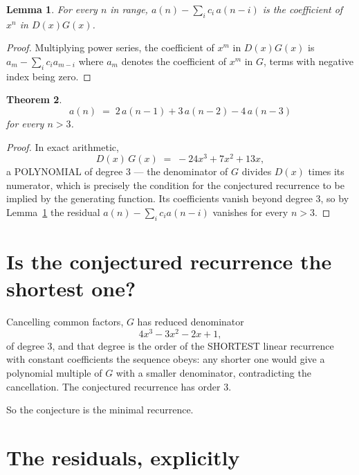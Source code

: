 \documentclass[11pt,a4paper]{article}
\theoremstyle{plain}
\newtheorem{theorem}{Theorem}
\newtheorem{lemma}[theorem]{Lemma}
\theoremstyle{definition}
\begin{document}
\begin{lemma}\label{lem:key}
For every $n$ in range, $a(n)-\sum_i c_i\,a(n-i)$ is the coefficient of $x^{n}$ in
$D(x)G(x)$.
\end{lemma}

\begin{proof}
Multiplying power series, the coefficient of $x^{m}$ in $D(x)G(x)$ is
$a_m-\sum_i c_i a_{m-i}$ where $a_m$ denotes the coefficient of $x^{m}$ in $G$, terms with
negative index being zero.
\end{proof}

\begin{theorem}
\[
a(n)\;=\;2\,a(n-1) + 3\,a(n-2) - 4\,a(n-3)
\]
for every $n>3$.
\end{theorem}

\begin{proof}
In exact arithmetic,
\[
D(x)\,G(x)\;=\;- 24 x^{3} + 7 x^{2} + 13 x,
\]
a POLYNOMIAL of degree $3$ --- the denominator of $G$ divides $D(x)$ times its numerator,
which is precisely the condition for the conjectured recurrence to be implied by the
generating function. Its coefficients vanish beyond degree $3$, so by
Lemma~\ref{lem:key} the residual $a(n)-\sum_ic_ia(n-i)$ vanishes for every
$n>3$.
\end{proof}

\section{Is the conjectured recurrence the shortest one?}

Cancelling common factors, $G$ has reduced denominator
\[
4 x^{3} - 3 x^{2} - 2 x + 1,
\]
of degree $3$, and that degree is the order of the SHORTEST linear recurrence with
constant coefficients the sequence obeys: any shorter one would give a polynomial multiple of
$G$ with a smaller denominator, contradicting the cancellation. The conjectured recurrence has
order $3$.

So the conjecture is the minimal recurrence.

\section{The residuals, explicitly}
\end{document}

